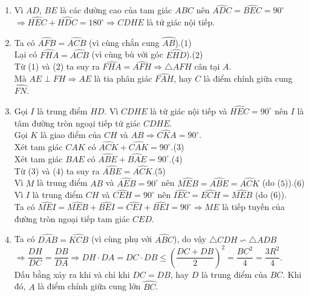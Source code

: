 \begin{ex}
{\begin{center}
\end{center}
\begin{enumerate}
\item Vì $ AD $, $ BE $ là các đường cao của tam giác $ ABC $ nên $ \widehat{ADC}=\widehat{BEC}=90^\circ$\\
$\Rightarrow \widehat{HEC}+\widehat{HDC}=180^{\circ}\Rightarrow CDHE$ là tứ giác nội tiếp.
\item Ta có $ \widehat{AFB}=\widehat{ACB} $ (vì cùng chắn cung $ \wideparen{AB} $).\hfill ($ 1 $)\\
Lại có $ \widehat{FHA}=\widehat{ACB} $ (vì cùng bù với góc $ \widehat{EHD} $).\hfill ($ 2 $)\\
Từ ($ 1 $) và ($ 2 $) ta suy ra $ \widehat{FHA}=\widehat{AFH}\Rightarrow\triangle AFH $ cân tại $ A $.\\
Mà $ AE\perp FH\Rightarrow AE $ là tia phân giác $ \widehat{FAH} $, hay $ C $ là điểm chính giữa cung $ \wideparen{FN} $.
\item Gọi $ I $ là trung điểm $ HD $. Vì $ CDHE $ là tứ giác nội tiếp và $ \widehat{HEC}=90^{\circ} $ nên $ I $ là tâm đường tròn ngoại tiếp tứ giác $ CDHE $.\\
Gọi $ K $ là giao điểm của $ CH $ và $ AB\Rightarrow \widehat{CKA}=90^{\circ} $.\\
Xét tam giác $ CAK $ có $ \widehat{ACK}+\widehat{CAK}=90^{\circ} $.\hfill($ 3 $)\\
Xét tam giác $ BAE $ có $ \widehat{ABE}+\widehat{BAE}=90^{\circ} $.\hfill($ 4 $)\\
Từ ($ 3 $) và ($ 4 $) ta suy ra $ \widehat{ABE}=\widehat{ACK} $.\hfill($ 5 $)\\
Vì $ M $ là trung điểm $ AB $ và $ \widehat{AEB}=90^{\circ} $ nên $ \widehat{MEB}=\widehat{ABE}=\widehat{ACK} $ (do ($ 5 $)).\hfill($ 6 $)\\
Vì $ I $ là trung điểm $ CH $ và $ \widehat{CEH}=90^{\circ} $ nên $ \widehat{IEC}=\widehat{ECH}=\widehat{MEB} $ (do ($ 6 $)).\\
Ta có $ \widehat{MEI}=\widehat{MEB}+\widehat{BEI}=\widehat{CEI}+\widehat{BEI}=90^{\circ}\Rightarrow ME $ là tiếp tuyến của đường tròn ngoại tiếp tam giác $ CED $.
\item Ta có $ \widehat{DAB}=\widehat{KCB} $ (vì cùng phụ với $ \widehat{ABC} $), do vậy $ \triangle CDH\backsim \triangle ADB$\\
$\Rightarrow \dfrac{DH}{DC}=\dfrac{DB}{DA}\Rightarrow DH\cdot DA=DC\cdot DB\leq \left(\dfrac{DC+DB}{2} \right)^{2}=\dfrac{BC^{2}}{4}=\dfrac{3R^{2}}{4}$.\\
Dấu bằng xảy ra khi và chỉ khi $ DC=DB $, hay $ D $ là trung điểm của $ BC $. Khi đó, $ A $ là điểm chính giữa cung lớn $ \wideparen{BC} $.
\end{enumerate}
}
\end{ex}
